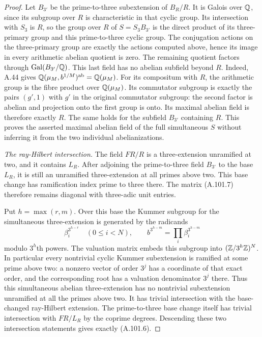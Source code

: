 \begin{proof}
Let $B_{3'}$ be the prime-to-three subextension of
$B_R/R$.
It is Galois over $\mathbb Q$, since its subgroup over $R$
is characteristic in that cyclic group.
Its intersection with $S_3$ is $R$, so the group
over $R$ of $S=S_3B_{3'}$ is the direct product
of its three-primary group and this prime-to-three
cyclic group.
The conjugation actions on the three-primary group
are exactly the actions computed above, hence its
image in every arithmetic abelian quotient is zero.
The remaining quotient factors through
$\operatorname{Gal}(B_{3'}/\mathbb Q)$.
This last field has no abelian subfield beyond $R$.
Indeed, A.44 gives
$\mathbb Q(\mu_M,b^{1/M})^{\rm ab}=\mathbb Q(\mu_M)$.
For its compositum with $R$, the arithmetic group
is the fibre product over $\mathbb Q(\mu_M)$.
Its commutator subgroup is exactly the pairs
$(g',1)$ with $g'$ in the original commutator
subgroup: the second factor is abelian and projection
onto the first group is onto.
Its maximal abelian field is therefore exactly $R$.
The same holds for the subfield $B_{3'}$ containing
$R$.  This proves the asserted maximal abelian
field of the full simultaneous $S$ without inferring
it from the two individual abelianizations.

\emph{The ray-Hilbert intersection.}
The field $FR/R$ is a three-extension unramified at
two, and it contains $L_R$.
After adjoining the prime-to-three field $B_{3'}$
to the base $L_R$, it is still an unramified
three-extension at all primes above two.
This base change has ramification index prime to
three there.
The matrix (A.101.7) therefore remains diagonal
with three-adic unit entries.

Put $h=\max(r,m)$.
Over this base the Kummer subgroup for the simultaneous
three-extension is generated by the radicands
\[
          \beta_i^{3^{h-r}}\quad(0\le i<N),
                   \qquad b^{3^{h-m}}
                          =\prod_i\beta_i^{3^{h-m}}
 \tag{A.101.13}
\]
modulo $3^h$th powers.
The valuation matrix embeds this subgroup into
$(\mathbb Z/3^h\mathbb Z)^N$.
In particular every nontrivial cyclic Kummer
subextension is ramified at some prime above two:
a nonzero vector of order $3^j$ has a coordinate
of that exact order, and the corresponding root
has a valuation denominator $3^j$ there.
Thus this simultaneous abelian three-extension
has no nontrivial subextension unramified at
all the primes above two.
It has trivial intersection with the base-changed
ray-Hilbert extension.
The prime-to-three base change itself has trivial
intersection with $FR/L_R$ by the coprime degrees.
Descending these two intersection statements gives
exactly (A.101.6).


\end{proof}
